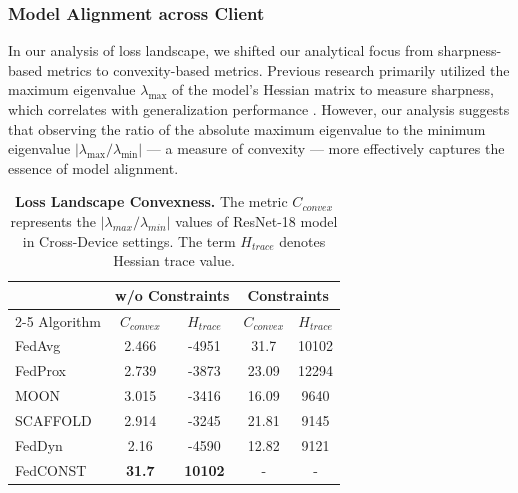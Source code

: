 \documentclass{article}
\theoremstyle{plain}
\theoremstyle{definition}
\theoremstyle{remark}
\begin{document}
\subsubsection{Model Alignment across Client}
In our analysis of loss landscape, we shifted our analytical focus from sharpness-based metrics to convexity-based metrics. Previous research primarily utilized the maximum eigenvalue $\lambda_{\mathrm{max}}$ of the model's Hessian matrix to measure sharpness, which correlates with generalization performance \cite{fedalign}. However, our analysis suggests that observing the ratio of the absolute maximum eigenvalue to the minimum eigenvalue $\left|\lambda_{\mathrm{max}}/\lambda_{\mathrm{min}}\right|$  — a measure of convexity\cite{saddle} — more effectively captures the essence of model alignment. 

\begin{table}[h]
\caption{\textbf{Loss Landscape Convexness. }The metric $C_{convex}$ represents the $|\lambda_{max} / \lambda_{min} |$ values of ResNet-18 model in Cross-Device settings. The term $H_{trace}$ denotes Hessian trace value.}
\vskip 0.15in
\begin{center}
\begin{small}
\begin{sc}
\begin{tabular}{|l|c|c|c|c|}
\hline
& \multicolumn{2}{c|}{w/o Constraints} & \multicolumn{2}{c|}{Constraints} \\
\cline{2-5}
Algorithm & $C_{convex}$ & $H_{trace}$ & $C_{convex}$ & $H_{trace}$ \\
\hline
FedAvg & 2.466 & -4951 & 31.7 & 10102 \\
FedProx & 2.739 & -3873 & 23.09 & 12294 \\
MOON & 3.015 & -3416 & 16.09 & 9640 \\
SCAFFOLD & 2.914 & -3245 & 21.81 & 9145 \\
FedDyn & 2.16 & -4590 & 12.82 & 9121 \\
FedCONST & \textbf{31.7} & \textbf{10102} & - & - \\
\hline
\end{tabular}
\label{tab:convexness}
\end{sc}
\end{small}
\end{center}
\vskip 0.2in
\end{table}
\end{document}
